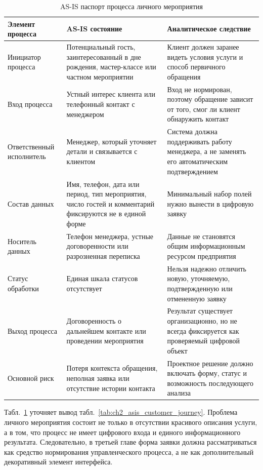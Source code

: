 \begin{table}[H]
\centering
\small
\caption{AS-IS паспорт процесса личного мероприятия}
\label{tab:ch2_event_process_passport}
\begin{tabularx}{\textwidth}{|>{\raggedright\arraybackslash}p{}|>{\raggedright\arraybackslash}p{}|>{\raggedright\arraybackslash}X|}
\hline
\textbf{Элемент процесса} & \textbf{AS-IS состояние} & \textbf{Аналитическое следствие} \\ \hline
Инициатор процесса & Потенциальный гость, заинтересованный в дне рождения, мастер-классе или частном мероприятии & Клиент должен заранее видеть условия услуги и способ первичного обращения \\ \hline
Вход процесса & Устный интерес клиента или телефонный контакт с менеджером & Вход не нормирован, поэтому обращение зависит от того, смог ли клиент обнаружить контакт \\ \hline
Ответственный исполнитель & Менеджер, который уточняет детали и связывается с клиентом & Система должна поддерживать работу менеджера, а не заменять его автоматическим подтверждением \\ \hline
Состав данных & Имя, телефон, дата или период, тип мероприятия, число гостей и комментарий фиксируются не в единой форме & Минимальный набор полей нужно вынести в цифровую заявку \\ \hline
Носитель данных & Телефон менеджера, устные договоренности или разрозненная переписка & Данные не становятся общим информационным ресурсом предприятия \\ \hline
Статус обработки & Единая шкала статусов отсутствует & Нельзя надежно отличить новую, уточняемую, подтвержденную или отмененную заявку \\ \hline
Выход процесса & Договоренность о дальнейшем контакте или проведении мероприятия & Результат существует организационно, но не всегда фиксируется как проверяемый цифровой объект \\ \hline
Основной риск & Потеря контекста обращения, неполная заявка или отсутствие истории контакта & Проектное решение должно включать форму, статус и возможность последующего анализа \\ \hline
\end{tabularx}
\normalsize
\end{table}

Табл.~\ref{tab:ch2_event_process_passport} уточняет вывод табл.~\ref{tab:ch2_asis_customer_journey}. Проблема личного мероприятия состоит не только в отсутствии красивого описания услуги, а в том, что процесс не имеет цифрового входа и единого информационного результата. Следовательно, в третьей главе форма заявки должна рассматриваться как средство нормирования управленческого процесса, а не как дополнительный декоративный элемент интерфейса.

